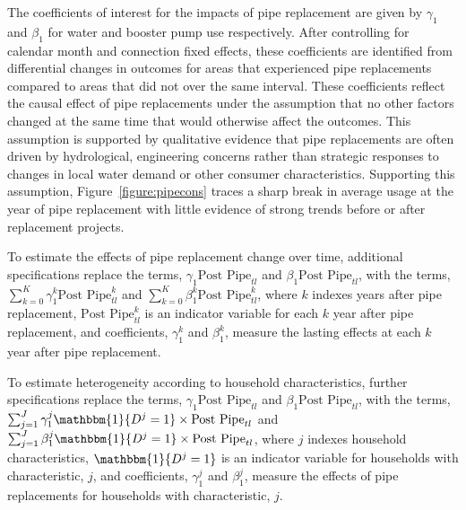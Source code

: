 \documentclass[12pt,table]{article}
\begin{document}
The coefficients of interest for the impacts of pipe replacement are given by $\gamma_1$ and $\beta_1$ for water and booster pump use respectively.  After controlling for calendar month and connection fixed effects, these coefficients are identified from differential changes in outcomes for areas that experienced pipe replacements compared to areas that did not over the same interval.  These coefficients reflect the causal effect of pipe replacements under the assumption that no other factors changed at the same time that would otherwise affect the outcomes.  This assumption is supported by qualitative evidence that pipe replacements are often driven by hydrological, engineering concerns rather than strategic responses to changes in local water demand or other consumer characteristics.  Supporting this assumption, Figure~\ref{figure:pipecons} traces a sharp break in average usage at the year of pipe replacement with little evidence of strong trends before or after replacement projects.

To estimate the effects of pipe replacement change over time, additional specifications replace the terms, $\gamma_1  \text{Post Pipe}_{tl} $ and $\beta_1  \text{Post Pipe}_{tl} $, with the terms, $\sum_{k=0}^{K} \gamma_1^{k}  \text{Post Pipe}_{tl}^{k} $ and  $\sum_{k=0}^{K} \beta_1^{k}  \text{Post Pipe}_{tl}^{k} $, where $k$ indexes years after pipe replacement, $\text{Post Pipe}_{tl}^{k}$ is an indicator variable for each $k$ year after pipe replacement, and coefficients, $\gamma_1^{k}$ and $\beta_1^{k}$, measure the lasting effects at each $k$ year after pipe replacement.

To estimate heterogeneity according to household characteristics, further specifications replace the terms, $\gamma_1  \text{Post Pipe}_{tl} $ and $\beta_1  \text{Post Pipe}_{tl} $, with the terms, $\sum_{j=1}^{J} \gamma_1^{j} \mathbbm{1}\{D^{j}=1\} \times \text{Post Pipe}_{tl} $ and  $\sum_{j=1}^{J} \beta_1^{j} \mathbbm{1}\{D^{j}=1\} \times \text{Post Pipe}_{tl} $, where $j$ indexes household characteristics, $\mathbbm{1}\{D^{j}=1\}$ is an indicator variable for households with characteristic, $j$, and coefficients, $\gamma_1^{j}$ and $\beta_1^{j}$, measure the effects of pipe replacements for households with characteristic, $j$.
\end{document}
